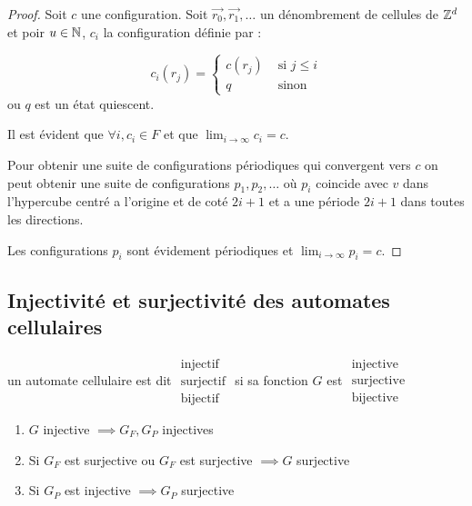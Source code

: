 \begin{proof}
	Soit $c$ une configuration.
	Soit $\vec {r_0}, \vec {r_1},\ldots$ un dénombrement de cellules de $\mathbb{Z}^d$ et poir $u \in \mathbb{N}$,
	$c_i$ la configuration définie par :

	$$ c_i(r_j) = \left\{ \begin{array}{cc}
			c(r_j) & \text{ si } j \leq i \\
			q      & \text{ sinon }
		\end{array}
		\right.$$
	ou $q$ est un état quiescent.

	Il est évident que $\forall i, c_i \in F$ et que $\lim_{i \to \infty} c_i = c$.

	Pour obtenir une suite de configurations périodiques qui convergent vers $c$ on peut obtenir une suite de configurations
	$p_1, p_2, \ldots $ où $p_i$ coincide avec $v$ dans l'hypercube centré a l'origine et de coté $2i + 1$ et a une
	période $2i + 1$ dans toutes les directions.

	Les configurations $p_i$ sont évidement périodiques et $\lim_{i \to \infty} p_i = c$.
\end{proof}

\subsection{Injectivité et surjectivité des automates cellulaires}

\begin{definition}
	un automate cellulaire est dit
	$\begin{array}{c}
			\text{injectif}  \\
			\text{surjectif} \\
			\text{bijectif}
		\end{array}$
	si sa fonction $G$ est
	$\begin{array}{c}
			\text{injective}  \\
			\text{surjective} \\
			\text{bijective}
		\end{array}$
\end{definition}


\begin{theorem}
	\begin{enumerate}
		\item $G$ injective $\implies G_F, G_P$ injectives \label{thm:big1}
		\item Si $G_F$ est surjective ou $G_F$ est surjective $\implies G$ surjective \label{thm:big2}
		\item Si $G_P$ est injective $\implies G_P$ surjective \label{thm:big3}
	\end{enumerate}
\end{theorem}

